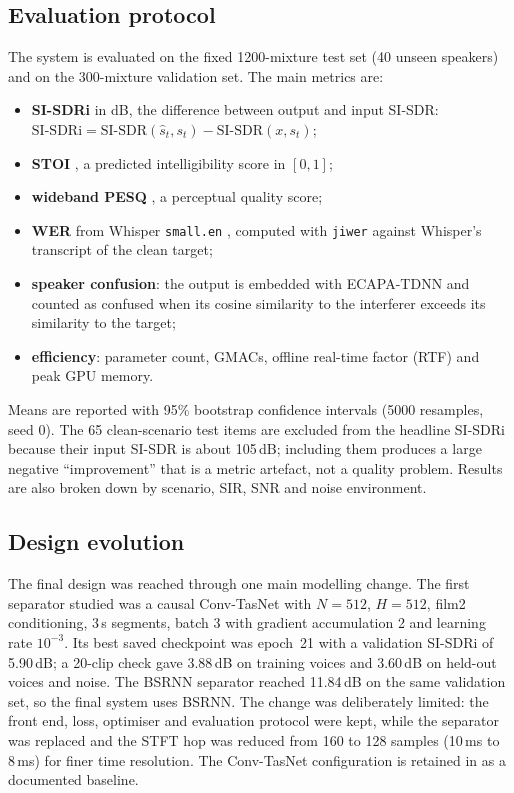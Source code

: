 \documentclass[11pt,a4paper]{article}
\newcommand{\sisdr}{SI-SDR}
\newcommand{\sisdri}{SI-SDRi}
\begin{document}
\subsection{Evaluation protocol}
\label{sec:eval}
The system is evaluated on the fixed 1200-mixture test set (40 unseen speakers) and on the
300-mixture validation set. The main metrics are:
\begin{itemize}
  \item \textbf{\sisdri} in dB, the difference between output and input \sisdr:
        $\mathrm{SI\text{-}SDRi}=\mathrm{SI\text{-}SDR}(\hat{s}_t,s_t)
        -\mathrm{SI\text{-}SDR}(x,s_t)$;
  \item \textbf{STOI} \cite{taal2011stoi}, a predicted intelligibility score in $[0,1]$;
  \item \textbf{wideband PESQ} \cite{itu2007p8622}, a perceptual quality score;
  \item \textbf{WER} from Whisper \texttt{small.en} \cite{radford2023whisper}, computed with
        \texttt{jiwer} against Whisper's transcript of the clean target;
  \item \textbf{speaker confusion}: the output is embedded with ECAPA-TDNN and counted as confused
        when its cosine similarity to the interferer exceeds its similarity to the target;
  \item \textbf{efficiency}: parameter count, GMACs, offline real-time factor (RTF) and peak GPU
        memory.
\end{itemize}
Means are reported with 95\% bootstrap confidence intervals (5000 resamples, seed 0). The 65
clean-scenario test items are excluded from the headline \sisdri{} because their input \sisdr{} is
about 105\,dB; including them produces a large negative ``improvement'' that is a metric artefact,
not a quality problem. Results are also broken down by scenario, SIR, SNR and noise environment.

\subsection{Design evolution}
The final design was reached through one main modelling change. The first separator studied was a
causal Conv-TasNet \cite{luo2019convtasnet} with $N=512$, $H=512$, film2 conditioning, 3\,s
segments, batch 3 with gradient accumulation 2 and learning rate $10^{-3}$. Its best saved
checkpoint was epoch~21 with a validation \sisdri{} of 5.90\,dB; a 20-clip check gave 3.88\,dB on
training voices and 3.60\,dB on held-out voices and noise. The BSRNN separator reached 11.84\,dB
on the same validation set, so the final system uses BSRNN. The change was deliberately limited:
the front end, loss, optimiser and evaluation protocol were kept, while the separator was replaced
and the STFT hop was reduced from 160 to 128 samples (10\,ms to 8\,ms) for finer time resolution.
The Conv-TasNet configuration is retained in  as a documented baseline.
\end{document}
